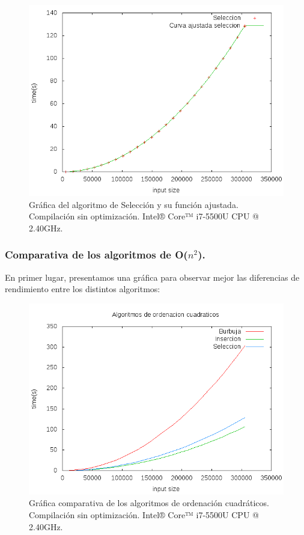 \documentclass[11pt,a4paper]{article}
\begin{document}
				\begin{figure}[h]

					\centering
					\includegraphics[width=1\textwidth]{seleccion_ajustado.png}
					\caption{Gráfica del algoritmo de Selección y su función ajustada. Compilación sin optimización. Intel® Core™ i7-5500U CPU @ 2.40GHz.}

				\end{figure}

\newpage

			\subsubsection{Comparativa de los algoritmos de O($n^2$).}

				\par
				En primer lugar, presentamos una gráfica para observar mejor las diferencias de rendimiento entre los distintos algoritmos:

				\begin{figure}[h]

					\centering
					\includegraphics[width=1\textwidth]{Ncuadrado.png}
					\caption{Gráfica comparativa de los algoritmos de ordenación cuadráticos. Compilación sin optimización. Intel® Core™ i7-5500U CPU @ 2.40GHz.}

				\end{figure}
\end{document}
